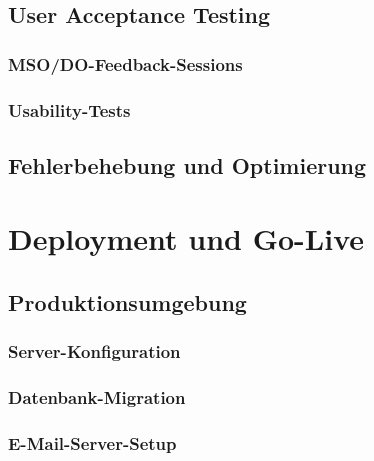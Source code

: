 \documentclass[11pt,a4paper]{article}
\begin{document}
\subsection{User Acceptance Testing}

\subsubsection{MSO/DO-Feedback-Sessions}

\subsubsection{Usability-Tests}

\subsection{Fehlerbehebung und Optimierung}

\newpage
\section{Deployment und Go-Live}

\subsection{Produktionsumgebung}

\subsubsection{Server-Konfiguration}

\subsubsection{Datenbank-Migration}

\subsubsection{E-Mail-Server-Setup}
\end{document}
